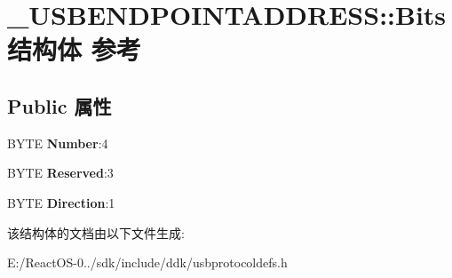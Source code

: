 \hypertarget{struct___u_s_b_e_n_d_p_o_i_n_t_a_d_d_r_e_s_s_1_1_bits}{}\section{\+\_\+\+U\+S\+B\+E\+N\+D\+P\+O\+I\+N\+T\+A\+D\+D\+R\+E\+SS\+:\+:Bits结构体 参考}
\label{struct___u_s_b_e_n_d_p_o_i_n_t_a_d_d_r_e_s_s_1_1_bits}
\subsection*{Public 属性}
\begin{DoxyCompactItemize}
\item 
\mbox{\label{struct___u_s_b_e_n_d_p_o_i_n_t_a_d_d_r_e_s_s_1_1_bits_a58217ee2e72cdf721cdef8d6e388c232}} 
B\+Y\+TE {\bfseries Number}\+:4
\item 
\mbox{\label{struct___u_s_b_e_n_d_p_o_i_n_t_a_d_d_r_e_s_s_1_1_bits_ab1e321055df11d3dee8a1fe78320cd34}} 
B\+Y\+TE {\bfseries Reserved}\+:3
\item 
\mbox{\label{struct___u_s_b_e_n_d_p_o_i_n_t_a_d_d_r_e_s_s_1_1_bits_a26028e8d0c6728cd8c44e6cda218c5bb}} 
B\+Y\+TE {\bfseries Direction}\+:1
\end{DoxyCompactItemize}


该结构体的文档由以下文件生成\+:\begin{DoxyCompactItemize}
\item 
E\+:/\+React\+O\+S-\/0../sdk/include/ddk/usbprotocoldefs.\+h\end{DoxyCompactItemize}

